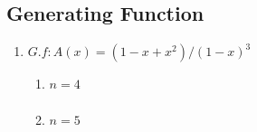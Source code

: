 \documentclass[a4paper,10pt]{article}
\begin{document}
\subsection{Generating Function}
\begin{enumerate}
\item $G.f : A(x) = (1-x+x^2)/(1-x)^3$
  \begin{enumerate}
    \item $n = 4$
    \[
     \boxed{ 
	  \begin{gathered}
      \end{gathered}	    
	  }
    \]	  
    \item $ n = 5$
    \[
     \boxed{ 
	  \begin{gathered}
      \end{gathered}	    
	  }
    \]	
  \end{enumerate}
\end{enumerate}






\end{document}
